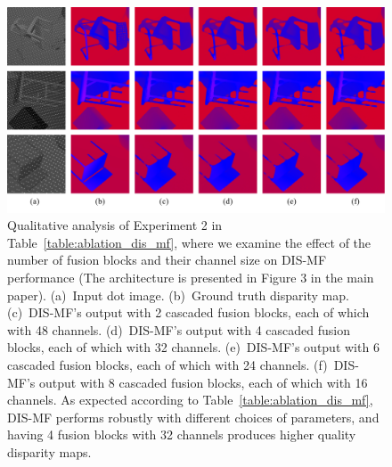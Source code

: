 \begin{figure}[t]
    \begin{center}
        \includegraphics[width=1.0\linewidth]{images/chapter2/supp_figures/ablation_mf_blch.jpg}
    \end{center}
   \caption{Qualitative analysis of Experiment 2 in Table~\ref{table:ablation_dis_mf}, where we examine the effect of the number of fusion blocks and their channel size on DIS-MF performance (The architecture is presented in Figure 3 in the main paper). (a)~Input dot image. (b)~Ground truth disparity map. (c)~DIS-MF's output with 2 cascaded fusion blocks, each of which with 48 channels. (d)~DIS-MF's output with 4 cascaded fusion blocks, each of which with 32 channels. (e)~DIS-MF's output with 6 cascaded fusion blocks, each of which with 24 channels. (f)~DIS-MF's output with 8 cascaded fusion blocks, each of which with 16 channels. As expected according to Table~\ref{table:ablation_dis_mf}, DIS-MF performs robustly with different choices of parameters, and having 4 fusion blocks with 32 channels produces higher quality disparity maps.}
    \label{fig:c2_ablation_mf_blch}
\end{figure}

